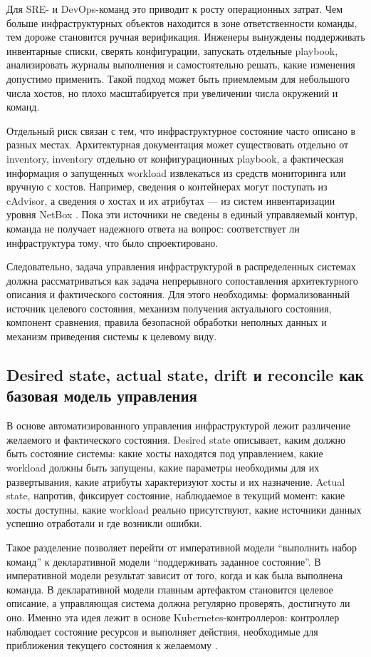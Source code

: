 Для SRE- и DevOps-команд это приводит к росту операционных затрат. Чем больше инфраструктурных объектов находится в зоне ответственности команды, тем дороже становится ручная верификация. Инженеры вынуждены поддерживать инвентарные списки, сверять конфигурации, запускать отдельные playbook, анализировать журналы выполнения и самостоятельно решать, какие изменения допустимо применить. Такой подход может быть приемлемым для небольшого числа хостов, но плохо масштабируется при увеличении числа окружений и команд.

Отдельный риск связан с тем, что инфраструктурное состояние часто описано в разных местах. Архитектурная документация может существовать отдельно от inventory, inventory отдельно от конфигурационных playbook, а фактическая информация о запущенных workload извлекаться из средств мониторинга или вручную с хостов. Например, сведения о контейнерах могут поступать из cAdvisor, а сведения о хостах и их атрибутах --- из систем инвентаризации уровня NetBox \cite{cadvisor_docs,netbox_docs}. Пока эти источники не сведены в единый управляемый контур, команда не получает надежного ответа на вопрос: соответствует ли инфраструктура тому, что было спроектировано.

Следовательно, задача управления инфраструктурой в распределенных системах должна рассматриваться как задача непрерывного сопоставления архитектурного описания и фактического состояния. Для этого необходимы: формализованный источник целевого состояния, механизм получения актуального состояния, компонент сравнения, правила безопасной обработки неполных данных и механизм приведения системы к целевому виду.

\subsection{Desired state, actual state, drift и reconcile как базовая модель управления}

В основе автоматизированного управления инфраструктурой лежит различение желаемого и фактического состояния. Desired state описывает, каким должно быть состояние системы: какие хосты находятся под управлением, какие workload должны быть запущены, какие параметры необходимы для их развертывания, какие атрибуты характеризуют хосты и их назначение. Actual state, напротив, фиксирует состояние, наблюдаемое в текущий момент: какие хосты доступны, какие workload реально присутствуют, какие источники данных успешно отработали и где возникли ошибки.

Такое разделение позволяет перейти от императивной модели ``выполнить набор команд'' к декларативной модели ``поддерживать заданное состояние''. В императивной модели результат зависит от того, когда и как была выполнена команда. В декларативной модели главным артефактом становится целевое описание, а управляющая система должна регулярно проверять, достигнуто ли оно. Именно эта идея лежит в основе Kubernetes-контроллеров: контроллер наблюдает состояние ресурсов и выполняет действия, необходимые для приближения текущего состояния к желаемому \cite{kubernetes_controllers}.

